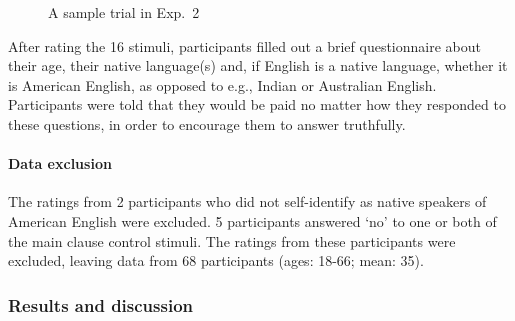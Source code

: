 \documentclass[11pt,fleqn]{article}
\newcommand{\6}{\mbox{$[\hspace*{-.6mm}[$}}
\newcommand{\9}{\mbox{$]\hspace*{-.6mm}]$}}
\begin{document}
\begin{figure}[h!]
\centering


\caption{A sample trial in Exp.~2}\label{f-trial-exp2}
\end{figure}

After rating the 16 stimuli, participants filled out a brief questionnaire about their age, their native language(s) and, if English is a native language, whether it is
American English, as opposed to e.g., Indian or Australian English.
Participants were told that they would be paid no matter how they
responded to these questions, in order to encourage them to answer
truthfully.

\paragraph{Data exclusion} The ratings from 2 participants who did not self-identify as native speakers of American English were excluded. 5 participants answered `no' to one or both of the main clause control stimuli. The ratings from these participants were excluded, leaving data from 68 participants (ages: 18-66; mean: 35).

\subsubsection{Results and discussion}
\end{document}
